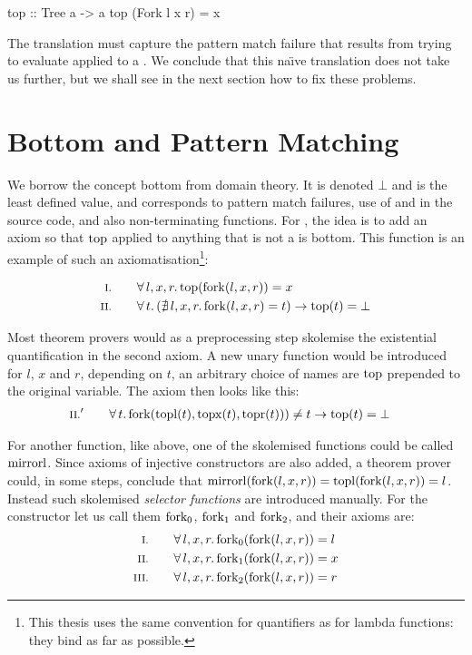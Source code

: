 \begin{code}
top :: Tree a -> a
top (Fork l x r) = x
\end{code}

The translation must capture the pattern match failure that results
from trying to evaluate  applied to a . We conclude
that this na\"{\i}ve translation does not take us further, but we
shall see in the next section how to fix these problems.

\section{Bottom and Pattern Matching}

We borrow the concept bottom from domain theory. It is denoted $\bot$
and is the least defined value, and corresponds to pattern match
failures, use of  and  in the source code, and
also non-terminating functions. For , the idea is to add an
axiom so that $\mathrm{top}$ applied to anything that is not a 
is bottom. This function is an example of such an
axiomatisation\footnote{This thesis uses the same convention for
  quantifiers as for lambda functions: they bind as far as possible.}:

\begin{align*}
\rom{1} \qquad & \faaa{l}{x}{r} \fn{top}(\fn{fork}(l,x,r)) \eq x \\
\rom{2} \qquad & \fa{t}         (\nexxx{l}{x}{r} \fn{fork}(l,x,r) \eq t) \rightarrow \fn{top}(t) \eq \bot
\end{align*}

Most theorem provers would as a preprocessing step skolemise the existential quantification in the second
axiom. A new unary function would be introduced for $l$, $x$ and $r$,
depending on $t$, an arbitrary choice of names are $\mathrm{top}$ prepended
to the original variable. The axiom then looks like
this:
\begin{align*}
\rom{2}' \qquad & \fa{t} \fn{fork}(\fn{topl}(t),\fn{topx}(t),\fn{topr}(t))) \neq t \rightarrow \fn{top}(t) \eq \bot
\end{align*}

For another function, like  above, one of the skolemised
functions could be called $\mathrm{mirrorl}$. Since axioms of injective
constructors are also added, a theorem prover could, in some steps,
conclude that $\mathrm{mirrorl}(\mathrm{fork}(l,x,r)) =
\mathrm{topl}(\mathrm{fork}(l,x,r)) = l$. Instead such skolemised
\emph{selector functions} are introduced manually.  For the 
constructor let us call them $\mathrm{fork_0}$, $\mathrm{fork_1}$ and
$\mathrm{fork_2}$, and their axioms are:
\begin{align*}
\rom{1} \qquad \faaa{l}{x}{r} \fn{fork_{0}}(\fn{fork}(l,x,r)) & \eq l \\
\rom{2} \qquad \faaa{l}{x}{r} \fn{fork_{1}}(\fn{fork}(l,x,r)) & \eq x \\
\rom{3} \qquad \faaa{l}{x}{r} \fn{fork_{2}}(\fn{fork}(l,x,r)) & \eq r
\end{align*}

